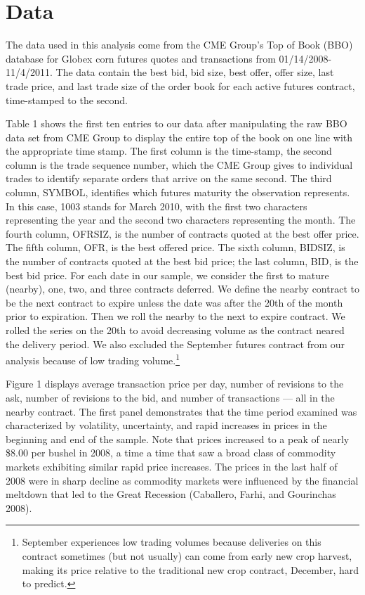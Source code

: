 \documentclass[]{elsarticle} %
\begin{document}
\section{Data}\label{data}

The data used in this analysis come from the CME Group's Top of Book
(BBO) database for Globex corn futures quotes and transactions from
01/14/2008-11/4/2011. The data contain the best bid, bid size, best
offer, offer size, last trade price, and last trade size of the order
book for each active futures contract, time-stamped to the second.

Table 1 shows the first ten entries to our data after manipulating the
raw BBO data set from CME Group to display the entire top of the book on
one line with the appropriate time stamp. The first column is the
time-stamp, the second column is the trade sequence number, which the
CME Group gives to individual trades to identify separate orders that
arrive on the same second. The third column, SYMBOL, identifies which
futures maturity the observation represents. In this case, 1003 stands
for March 2010, with the first two characters representing the year and
the second two characters representing the month. The fourth column,
OFRSIZ, is the number of contracts quoted at the best offer price. The
fifth column, OFR, is the best offered price. The sixth column, BIDSIZ,
is the number of contracts quoted at the best bid price; the last
column, BID, is the best bid price. For each date in our sample, we
consider the first to mature (nearby), one, two, and three contracts
deferred. We define the nearby contract to be the next contract to
expire unless the date was after the 20th of the month prior to
expiration. Then we roll the nearby to the next to expire contract. We
rolled the series on the 20th to avoid decreasing volume as the contract
neared the delivery period. We also excluded the September futures
contract from our analysis because of low trading volume.\footnote{September
  experiences low trading volumes because deliveries on this contract
  sometimes (but not usually) can come from early new crop harvest,
  making its price relative to the traditional new crop contract,
  December, hard to predict.}

Figure 1 displays average transaction price per day, number of revisions
to the ask, number of revisions to the bid, and number of transactions
--- all in the nearby contract. The first panel demonstrates that the
time period examined was characterized by volatility, uncertainty, and
rapid increases in prices in the beginning and end of the sample. Note
that prices increased to a peak of nearly \$8.00 per bushel in 2008, a
time a time that saw a broad class of commodity markets exhibiting
similar rapid price increases. The prices in the last half of 2008 were
in sharp decline as commodity markets were influenced by the financial
meltdown that led to the Great Recession (Caballero, Farhi, and
Gourinchas 2008).
\end{document}
